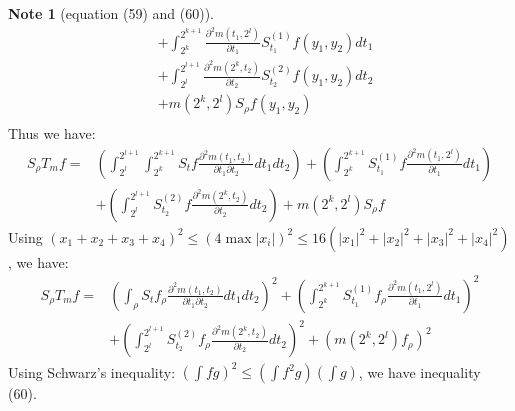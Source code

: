 \documentclass{report}
\theoremstyle{definition}
\newtheorem{note}{Note}
\theoremstyle{definition}
\theoremstyle{plain}
\numberwithin{theorem}{section}
\numberwithin{remark}{section}
\numberwithin{equation}{section}
\newcommand{\abs}[1]{\left\lvert#1\right\rvert}
\begin{document}
\begin{note}[equation (59) and (60)]
\begin{align*}
        &+\int_{2^k}^{2^{k+1}}\frac{\partial^2 m(t_1,2^l)}{\partial t_1}S_{t_1}^{(1)}f(y_1,y_2)dt_1\\
        &+\int_{2^l}^{2^{l+1}}\frac{\partial^2 m(2^k,t_2)}{\partial t_2}S_{t_2}^{(2)}f(y_1,y_2)dt_2\\
        &+m(2^k,2^l)S_\rho f(y_1,y_2)\\
        \end{align*}
        Thus we have:
        \begin{align*}
            S_\rho T_mf=&(\int_{2^l}^{2^{l+1}}\int_{2^k}^{2^{k+1}}S_tf\frac{\partial^2 m(t_1,t_2)}{\partial t_1\partial t_2}dt_1dt_2)+(\int_{2^k}^{2^{k+1}}S_{t_1}^{(1)}f\frac{\partial^2 m(t_1,2^l)}{\partial t_1}dt_1)\\
            &+(\int_{2^l}^{2^{l+1}}S_{t_2}^{(2)}f\frac{\partial^2 m(2^k,t_2)}{\partial t_2}dt_2)+m(2^k,2^l)S_\rho f
        \end{align*}
        Using $(x_1+x_2+x_3+x_4)^2\leq (4\max \abs{x_i})^2\leq 16(\abs{x_1}^2+\abs{x_2}^2+\abs{x_3}^2+\abs{x_4}^2)$, we have:
        \begin{align*}
            S_\rho T_mf=&(\int_\rho S_tf_\rho\frac{\partial^2 m(t_1,t_2)}{\partial t_1\partial t_2}dt_1dt_2)^2+(\int_{2^k}^{2^{k+1}}S_{t_1}^{(1)}f_\rho\frac{\partial^2 m(t_1,2^l)}{\partial t_1}dt_1)^2\\
            &+(\int_{2^l}^{2^{l+1}}S_{t_2}^{(2)}f_\rho\frac{\partial^2 m(2^k,t_2)}{\partial t_2}dt_2)^2+(m(2^k,2^l)f_\rho)^2
        \end{align*}
        Using Schwarz's inequality: $(\int{fg})^2\leq (\int{f^2g})(\int g)$, we have inequality (60).\par
\end{note}
\end{document}
